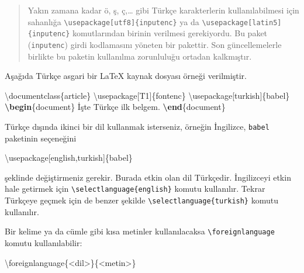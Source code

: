 \documentclass[
  10pt,
]{scrbook}
\newenvironment{Shaded}{\begin{snugshade}}{\end{snugshade}}
\newcommand{\BuiltInTok}[1]{#1}
\newcommand{\ExtensionTok}[1]{#1}
\newcommand{\FunctionTok}[1]{\textcolor[rgb]{0.00,0.00,0.00}{#1}}
\newcommand{\KeywordTok}[1]{\textcolor[rgb]{0.13,0.29,0.53}{\textbf{#1}}}
\newcommand{\NormalTok}[1]{#1}
\theoremstyle{definition}
\theoremstyle{definition}
\theoremstyle{definition}
\theoremstyle{definition}
\theoremstyle{remark}
\begin{document}
\begin{quote}
Yakın zamana kadar ö, ş, ç,\ldots{} gibi Türkçe karakterlerin kullanılabilmesi için sahanlığa \texttt{\textbackslash{}usepackage{[}utf8{]}\{inputenc\}} ya da \texttt{\textbackslash{}usepackage{[}latin5{]}\{inputenc\}} komutlarından birinin verilmesi gerekiyordu. Bu paket (\texttt{inputenc}) girdi kodlamasını yöneten bir pakettir. Son güncellemelerle birlikte bu paketin kullanılma zorunluluğu ortadan kalkmıştır.
\end{quote}

Aşağıda Türkçe asgari bir LaTeX kaynak dosyası örneği verilmiştir.

\begin{Shaded}
\begin{Highlighting}[]
\BuiltInTok{\textbackslash{}documentclass}\NormalTok{\{}\ExtensionTok{article}\NormalTok{\}}
\BuiltInTok{\textbackslash{}usepackage}\NormalTok{[T1]\{}\ExtensionTok{fontenc}\NormalTok{\}}
\BuiltInTok{\textbackslash{}usepackage}\NormalTok{[turkish]\{}\ExtensionTok{babel}\NormalTok{\}}
\KeywordTok{\textbackslash{}begin}\NormalTok{\{}\ExtensionTok{document}\NormalTok{\}}
\NormalTok{  İşte  Türkçe ilk belgem.}
\KeywordTok{\textbackslash{}end}\NormalTok{\{}\ExtensionTok{document}\NormalTok{\}}
\end{Highlighting}
\end{Shaded}

Türkçe dışında ikinci bir dil kullanmak isterseniz, örneğin İngilizce, \texttt{babel} paketinin seçeneğini

\begin{Shaded}
\begin{Highlighting}[]
\BuiltInTok{\textbackslash{}usepackage}\NormalTok{[english,turkish]\{}\ExtensionTok{babel}\NormalTok{\}}
\end{Highlighting}
\end{Shaded}

şeklinde değiştirmeniz gerekir. Burada etkin olan dil Türkçedir. İngilizceyi etkin hale getirmek için \texttt{\textbackslash{}selectlanguage\{english\}} komutu kullanılır. Tekrar Türkçeye geçmek için de benzer şekilde \texttt{\textbackslash{}selectlanguage\{turkish\}} komutu kullanılır.

Bir kelime ya da cümle gibi kısa metinler kullanılacaksa \texttt{\textbackslash{}foreignlanguage} komutu kullanılabilir:

\begin{Shaded}
\begin{Highlighting}[]
\FunctionTok{\textbackslash{}foreignlanguage}\NormalTok{\{\textless{}dil\textgreater{}\}\{\textless{}metin\textgreater{}\}}
\end{Highlighting}
\end{Shaded}
\end{document}
